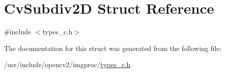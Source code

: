 \hypertarget{structCvSubdiv2D}{\section{Cv\-Subdiv2\-D Struct Reference}
\label{structCvSubdiv2D}
}


{\ttfamily \#include $<$types\-\_\-c.\-h$>$}



The documentation for this struct was generated from the following file\-:\begin{DoxyCompactItemize}
\item 
/usr/include/opencv2/imgproc/\hyperlink{imgproc_2types__c_8h}{types\-\_\-c.\-h}\end{DoxyCompactItemize}
